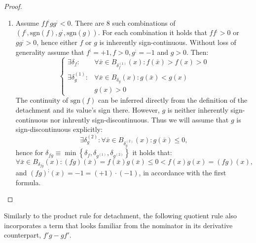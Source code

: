 \documentclass[11pt]{book}
\begin{document}
\begin{proof}
\begin{enumerate}
\item Assume $ff^{;}gg^{;}<0$. There are 8 such combinations of $\left(f^{;},\text{sgn}\left(f\right),g^{;},\text{sgn}\left(g\right)\right)$. For each combination it holds that $ff^{;}>0$ or $gg^{;}>0$, hence either $f$ or $g$ is inherently sign-continuous. Without loss of generality assume that $f^{;}=+1,f>0,g^{;}=-1$ and $g>0$. Then: $$\begin{cases} \exists\delta_{f}: & \forall\bar{x}\in B_{\delta_{f}^{\left(1\right)}}\left(x\right):f\left(\bar{x}\right) > f\left(x\right) >0\\ \exists\delta_{g}^{\left(1\right)}: & \forall\bar{x}\in B_{\delta_{g}}\left(x\right):g\left(\bar{x}\right)< g\left(x\right)\\ & g\left(x\right)>0 \end{cases}$$ The continuity of $\text{sgn}\left(f\right)$ can be inferred directly from the definition of the detachment and its value's sign there. However, $g$ is neither inherently sign-continuous nor inhrently sign-discontinuous. Thus we will assume that $g$ is sign-discontinuous explicitly: $$\exists\delta_{g}^{\left(2\right)}:\forall\bar{x}\in B_{\delta_{g}^{\left(2\right)}}\left(x\right):g\left(\bar{x}\right)\leq0,$$ hence for $\delta_{fg}\equiv\min\left\{ \delta_{f},\delta_{g^{\left(1\right)}},\delta_{g^{\left(2\right)}}\right\}$ it holds that: $$\forall\bar{x}\in B_{\delta_{fg}}\left(x\right):\left(fg\right)\left(\bar{x}\right)=f\left(\bar{x}\right)g\left(\bar{x}\right)\leq0 < f\left(x\right)g\left(x\right)=\left(fg\right)\left(x\right),$$ and $\left(fg\right)^{;}\left(x\right)=-1=\left(+1\right)\cdot\left(-1\right)$, in accordance with the first formula.
\end{enumerate}
\end{proof}

Similarly to the product rule for detachment, the following quotient rule also incorporates a term that looks familiar from the nominator in its derivative counterpart, $f'g-gf'$.
\end{document}
